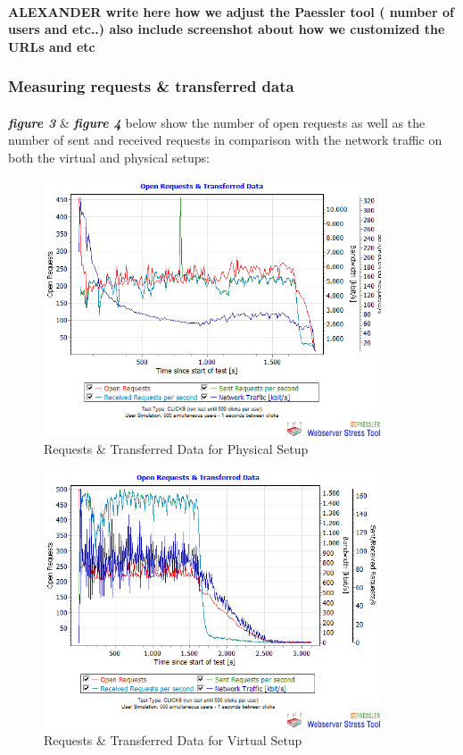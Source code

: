 \paragraph{}

\textbf{ALEXANDER write here how we adjust the Paessler tool ( number of users and etc..) also include screenshot about how we customized the URLs and etc}

\subsubsection{Measuring requests \& transferred data}
\paragraph{}

\textbf{\textit{figure 3}} \& \textbf{\textit{figure 4}} below show the number of open requests as well as the number of sent and received requests in comparison with the network traffic on both the virtual and physical setups:
 

 \begin{figure}[H]
    \centering
    \includegraphics[width=10cm]{Pictures/graph6hw.png}
    \caption{Requests \& Transferred Data for Physical Setup}
    \label{fig:QQ3}
\end{figure}
   
 
\begin{figure}[H]
    \centering
    \includegraphics[width=10cm]{Pictures/graph6vm.png}
    \caption{Requests \& Transferred Data for Virtual Setup}
    \label{fig:QQ3}
\end{figure} 


